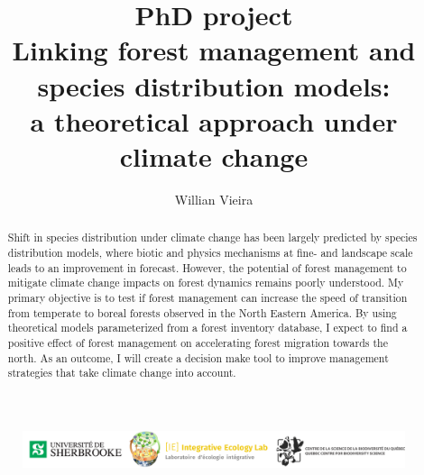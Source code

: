 


\title{
  PhD project \\
  \bigskip
  Linking forest management and species distribution models: \\
  a theoretical approach under climate change
}

\author[1,*]{Willian Vieira}
\date{}



\maketitle

\begin{abstract}
Shift in species distribution under climate change has been largely predicted by species distribution models, where biotic and physics mechanisms at fine- and landscape scale leads to an improvement in forecast.
However, the potential of forest management to mitigate climate change impacts on forest dynamics remains poorly understood.
My primary objective is to test if forest management can increase the speed of transition from temperate to boreal forests observed in the North Eastern America.
By using theoretical models parameterized from a forest inventory database, I expect to find a positive effect of forest management on accelerating forest migration towards the north.
As an outcome, I will create a decision make tool to improve management strategies that take climate change into account.
\end{abstract}


\tableofcontents

\vfill
\begin{figure}
\centering\includegraphics[width=16cm]{img/logo.pdf}
\end{figure}
\thispagestyle{empty} %
\clearpage

